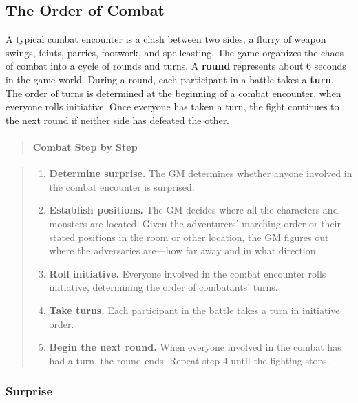 \documentclass[
]{article}
\date{}
\providecommand{\tightlist}{%
  \setlength{\itemsep}{0pt}\setlength{\parskip}{0pt}}
\begin{document}
\hypertarget{the-order-of-combat}{%
\subsection{The Order of Combat}\label{the-order-of-combat}}

A typical combat encounter is a clash between two sides, a flurry of
weapon swings, feints, parries, footwork, and spellcasting. The game
organizes the chaos of combat into a cycle of rounds and turns. A
\textbf{round} represents about 6 seconds in the game world. During a
round, each participant in a battle takes a \textbf{turn}. The order of
turns is determined at the beginning of a combat encounter, when
everyone rolls initiative. Once everyone has taken a turn, the fight
continues to the next round if neither side has defeated the other.

\begin{quote}
\mbox{}%
\hypertarget{combat-step-by-step}{%
\paragraph{Combat Step by Step}\label{combat-step-by-step}}
\end{quote}

\begin{quote}
\begin{enumerate}
\def\labelenumi{\arabic{enumi}.}
\tightlist
\item
  \textbf{Determine surprise.} The GM determines whether anyone involved
  in the combat encounter is surprised.
\item
  \textbf{Establish positions.} The GM decides where all the characters
  and monsters are located. Given the adventurers' marching order or
  their stated positions in the room or other location, the GM figures
  out where the adversaries are---how far away and in what direction.
\item
  \textbf{Roll initiative.} Everyone involved in the combat encounter
  rolls initiative, determining the order of combatants' turns.
\item
  \textbf{Take turns.} Each participant in the battle takes a turn in
  initiative order.
\item
  \textbf{Begin the next round.} When everyone involved in the combat
  has had a turn, the round ends. Repeat step 4 until the fighting
  stops.
\end{enumerate}
\end{quote}

\hypertarget{surprise}{%
\subsubsection{Surprise}\label{surprise}}
\end{document}
